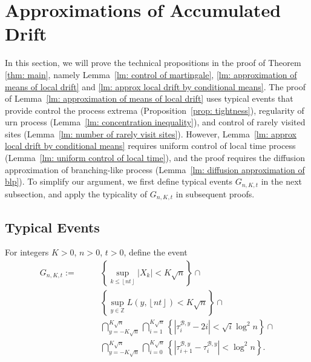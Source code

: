 \documentclass[twoside,12pt, a4paper, final]{article}
\numberwithin{equation}{section}
\theoremstyle{remark}
\begin{document}
	
	
	\section{Approximations of Accumulated Drift}\label{sec: approximations}
	
	In this section, we will prove the technical propositions in the proof of Theorem \ref{thm: main}, namely Lemma~\ref{lm: control of martingale}, \ref{lm: approximation of means of local drift} and \ref{lm: approx local drift by conditional means}. 
	The proof of Lemma~\ref{lm: approximation of means of local drift} uses typical events that provide control the process extrema (Proposition~\ref{prop: tightness}), regularity of urn process (Lemma~\ref{lm: concentration inequality}), and control of rarely visited sites (Lemma~\ref{lm: number of rarely visit sites}). 
	However, Lemma~\ref{lm: approx local drift by conditional means} requires uniform control of local time process (Lemma~\ref{lm: uniform control of local time}), and the proof requires the diffusion approximation of branching-like process (Lemma~\ref{lm: diffusion approximation of blp}).
	To simplify our argument, we first define typical events $G_{n, K, t}$ in the next subsection, and apply the typicality of $G_{n, K, t}$ in subsequent proofs.
	
	\subsection{Typical Events}
	
	For integers $K>0$, $n > 0$, $t>0$, define the event
	\begin{align}
		G_{n,K,t} :=  \qquad
		\label{eqn:good-event-1}
		& \left\{\sup _{k \le \left\lfloor nt  \right\rfloor} |X_k| < K \sqrt{n} \right\} \cap \\
		\label{eqn:good-event-2}
		& \left\{\sup_{y \in \mathbb{Z}} L(y, \left\lfloor nt  \right\rfloor) < K \sqrt{n} \right\} \cap \\
		\label{eqn:good-event-3}
		& \bigcap_{y = - K \sqrt{n} }^{K \sqrt{n}} 
		\bigcap_{i = 1}^{K \sqrt{n} } \left\{\left| \tau_i^{\mathcal{B},y} - 2 i \right| < \sqrt{ i } \log^2 n \right\}  \cap \\
		\label{eqn:good-event-4}
		& \bigcap_{y = - K \sqrt{n} }^{K \sqrt{n}} 
		\bigcap_{i = 0}^{K \sqrt{n} } \left\{\left| \tau_{i+1}^{\mathcal{B},y} - \tau_i^{\mathcal{B},y} \right| < \log^2 n \right\}  
		.\end{align}
	
\end{document}

